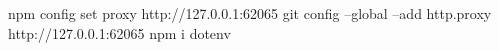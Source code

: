 npm config set proxy http://127.0.0.1:62065
git config --global --add http.proxy http://127.0.0.1:62065
npm i dotenv 